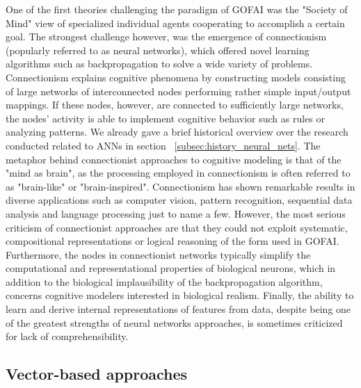 One of the first theories challenging the paradigm of \ac{GOFAI} was the "Society of Mind" \cite{Minsky1986} view of specialized individual agents cooperating to accomplish a certain goal.
The strongest challenge however, was the emergence of connectionism \cite{Rumelhart1986a} (popularly referred to as neural networks), which offered novel learning algorithms such as backpropagation \cite{Rumelhart1986} to solve a wide variety of problems.
Connectionism explains cognitive phenomena by constructing models consisting of large networks of interconnected nodes performing rather simple input/output mappings.
If these nodes, however, are connected to sufficiently large networks, the nodes' activity is able to implement cognitive behavior such as rules or analyzing patterns.
We already gave a brief historical overview over the research conducted related to \acp{ANN} in section ~\ref{subsec:history_neural_nets}. 
The metaphor behind connectionist approaches to cognitive modeling is that of the "mind as brain", as the processing employed in connectionism is often referred to as "brain-like" or "brain-inspired".
Connectionism has shown remarkable results in diverse applications such as computer vision, pattern recognition, sequential data analysis and language processing just to name a few.
However, the most serious criticism of connectionist approaches are that they could not exploit systematic, compositional representations or logical reasoning of the form used in \ac{GOFAI}. 
Furthermore, the nodes in connectionist networks typically simplify the computational and representational properties of biological neurons, which in addition to the biological implausibility of the backpropagation algorithm, concerns cognitive modelers interested in biological realism.
Finally, the ability to learn and derive internal representations of features from data, despite being one of the greatest strengths of neural networks approaches, is sometimes criticized for lack of comprehensibility.

\subsection{Vector-based approaches}%
\label{subsec:vector_based_approaches}


